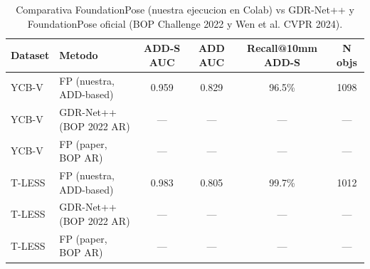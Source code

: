 \begin{table}[ht]
\centering
\caption{Comparativa FoundationPose (nuestra ejecucion en Colab) vs GDR-Net++ y FoundationPose oficial (BOP Challenge 2022 y Wen et al. CVPR 2024).}
\label{tab:fp_gdrnet_comparison}
\begin{tabular}{llcccc}
\toprule
Dataset & Metodo & ADD-S AUC & ADD AUC & Recall@10mm ADD-S & N objs \\
\midrule
YCB-V & FP (nuestra, ADD-based) & 0.959 & 0.829 & 96.5\% & 1098 \\
YCB-V & GDR-Net++ (BOP 2022 AR) & --- & --- & --- & --- \\
YCB-V & FP (paper, BOP AR) & --- & --- & --- & --- \\
T-LESS & FP (nuestra, ADD-based) & 0.983 & 0.805 & 99.7\% & 1012 \\
T-LESS & GDR-Net++ (BOP 2022 AR) & --- & --- & --- & --- \\
T-LESS & FP (paper, BOP AR) & --- & --- & --- & --- \\
\bottomrule
\end{tabular}
\end{table}

